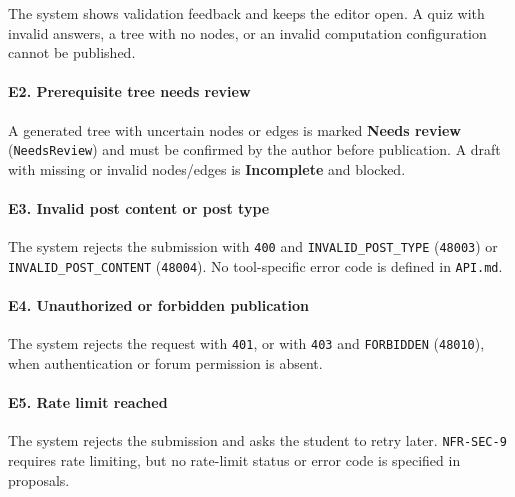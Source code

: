 \documentclass[12pt]{article}
\begin{document}
The system shows validation feedback and keeps the editor open. A quiz with invalid answers, a tree with no nodes, or an invalid computation configuration cannot be published.
\par\medskip

\hypertarget{sec:e2-prerequisite-tree-needs-review}{}
\paragraph*{E2. Prerequisite tree needs review}
\par\medskip

A generated tree with uncertain nodes or edges is marked \textbf{Needs review} (\texttt{NeedsReview}) and must be confirmed by the author before publication. A draft with missing or invalid nodes/edges is \textbf{Incomplete} and blocked.
\par\medskip

\hypertarget{sec:e3-invalid-post-content-or-post-type}{}
\paragraph*{E3. Invalid post content or post type}
\par\medskip

The system rejects the submission with \texttt{400} and \texttt{INVALID\_POST\_TYPE} (\texttt{48003}) or \texttt{INVALID\_POST\_CONTENT} (\texttt{48004}). No tool-specific error code is defined in \texttt{API.md}.
\par\medskip

\hypertarget{sec:e4-unauthorized-or-forbidden-publication}{}
\paragraph*{E4. Unauthorized or forbidden publication}
\par\medskip

The system rejects the request with \texttt{401}, or with \texttt{403} and \texttt{FORBIDDEN} (\texttt{48010}), when authentication or forum permission is absent.
\par\medskip

\hypertarget{sec:e5-rate-limit-reached}{}
\paragraph*{E5. Rate limit reached}
\par\medskip

The system rejects the submission and asks the student to retry later. \texttt{NFR-SEC-9} requires rate limiting, but no rate-limit status or error code is specified in proposals.
\par\medskip
\end{document}
